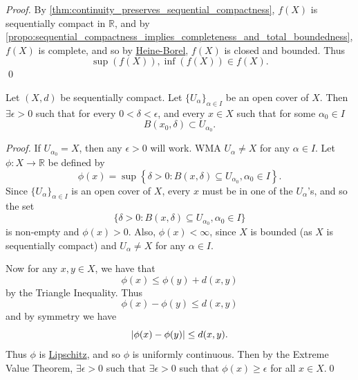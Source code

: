 \documentclass[notoc,notitlepage]{tufte-book}
\begin{document}
\begin{proof}
  By \cref{thm:continuity_preserves_sequential_compactness}, $f(X)$ is sequentially compact in $\mathbb{R}$, and by \cref{propo:sequential_compactness_implies_completeness_and_total_boundedness}, $f(X)$ is complete, and so by \hyperref[thm:heine_borel_theorem]{Heine-Borel}, $f(X)$ is closed and bounded. Thus
  \begin{equation*}
    \sup(f(X)), \inf(f(X)) \in f(X).
  \end{equation*}\qed\
\end{proof}

\begin{thm}[Lesbesgue]\label{thm:lesbesgue}
  Let $(X, d)$ be sequentially compact. Let $\{ U_\alpha \}_{\alpha \in I}$ be an open cover of $X$. Then $\exists \epsilon > 0$ such that for every $0 < \delta < \epsilon$, and every $x \in X$ such that for some $\alpha_0 \in I$
  \begin{equation*}
    B(x_0, \delta) \subset U_{\alpha_0}.
  \end{equation*}
\end{thm}

\begin{proof}
  If $U_{\alpha_0} = X$, then any $\epsilon > 0$ will work. WMA $U_\alpha \neq X$ for any $\alpha \in I$. Let $\phi : X \to \mathbb{R}$ be defined by
  \begin{equation*}
    \phi(x) = \sup \left\{ \delta > 0 : B(x, \delta) \subseteq U_{\alpha_0}, \alpha_0 \in I \right\}.
  \end{equation*}
  Since $\{ U_\alpha \}_{\alpha \in I}$ is an open cover of $X$, every $x$ must be in one of the $U_\alpha$'s, and so the set
  \begin{equation*}
    \{ \delta > 0 : B(x, \delta) \subseteq U_{\alpha_0}, \alpha_0 \in I \}
  \end{equation*}
  is non-empty and $\phi(x) > 0$. Also, $\phi(x) < \infty$, since $X$ is bounded (as $X$ is sequentially compact) and $U_\alpha \neq X$ for any $\alpha \in I$.

  Now for any $x, y \in X$,  we have that
  \begin{equation*}
    \phi(x) \leq \phi(y) + d(x,y)
  \end{equation*}
  by the Triangle Inequality. Thus
  \begin{equation*}
    \phi(x) - \phi(y) \leq d(x, y)
  \end{equation*}
  and by symmetry we have
  \begin{equation*}
    \left| \phi(x) - \phi(y) \right| \leq d(x, y).
  \end{equation*}
  Thus $\phi$ is \hyperref[defn:lipschitz]{Lipschitz}, and so $\phi$ is uniformly continuous. Then by the Extreme Value Theorem, $\exists \epsilon > 0$ such that $\exists \epsilon > 0$ such that $\phi(x) \geq \epsilon$ for all $x \in X$.\qed\
\end{proof}
\end{document}
